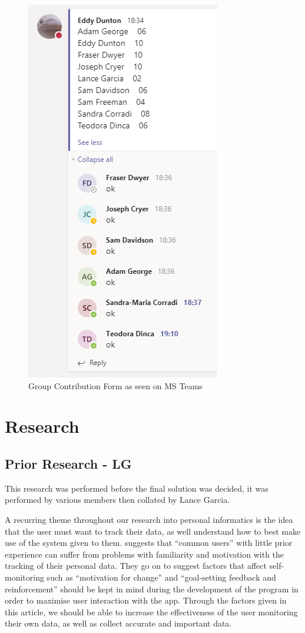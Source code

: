 \documentclass[10pt, notitlepage]{report}
\begin{document}
\begin{figure}[!h]
	\includegraphics{gcf.png}
	\caption{Group Contribution Form as seen on MS Teams}
	\label{fig:gcf}
\end{figure}

\newpage

\section{Research}
\label{res:res}

\subsection{Prior Research - LG}
\label{res:prior}

This research was performed before the final solution was decided, it was performed by various members then collated by Lance Garcia.\newline

A recurring theme throughout our research into personal informatics is the idea that the user must want to track their data, as well understand how to best make use of the system given to them. \cite{Rapp2014a} suggests that “common users” with little prior experience can suffer from problems with familiarity and motivation with the tracking of their personal data. They go on to suggest factors that affect self-monitoring such as “motivation for change” and “goal-setting feedback and reinforcement” should be kept in mind during the development of the program in order to maximise user interaction with the app. Through the factors given in this article, we should be able to increase the effectiveness of the user monitoring their own data, as well as collect accurate and important data.
\end{document}
